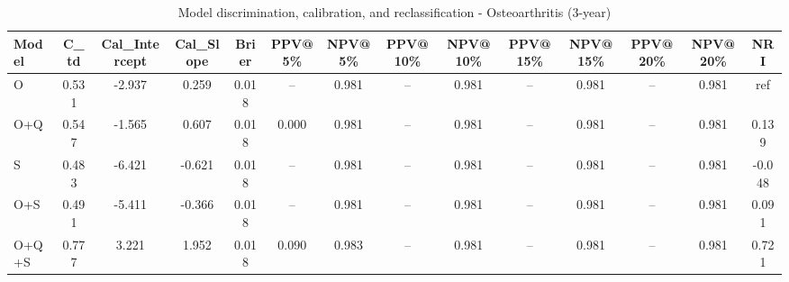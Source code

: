 \begin{table}[htbp]
\centering
\small
\caption{Model discrimination, calibration, and reclassification - Osteoarthritis (3-year)}
\label{tab:perf_osteoarthritis_3y}
\begin{tabular}{lccccccccccccc}
\toprule
Model & C\_td & Cal\_Intercept & Cal\_Slope & Brier & PPV@5\% & NPV@5\% & PPV@10\% & NPV@10\% & PPV@15\% & NPV@15\% & PPV@20\% & NPV@20\% & NRI \\
\midrule
O & 0.531 & -2.937 & 0.259 & 0.018 & -- & 0.981 & -- & 0.981 & -- & 0.981 & -- & 0.981 & ref \\
O+Q & 0.547 & -1.565 & 0.607 & 0.018 & 0.000 & 0.981 & -- & 0.981 & -- & 0.981 & -- & 0.981 & 0.139 \\
S & 0.483 & -6.421 & -0.621 & 0.018 & -- & 0.981 & -- & 0.981 & -- & 0.981 & -- & 0.981 & -0.048 \\
O+S & 0.491 & -5.411 & -0.366 & 0.018 & -- & 0.981 & -- & 0.981 & -- & 0.981 & -- & 0.981 & 0.091 \\
O+Q+S & 0.777 & 3.221 & 1.952 & 0.018 & 0.090 & 0.983 & -- & 0.981 & -- & 0.981 & -- & 0.981 & 0.721 \\
\bottomrule
\end{tabular}
\end{table}
